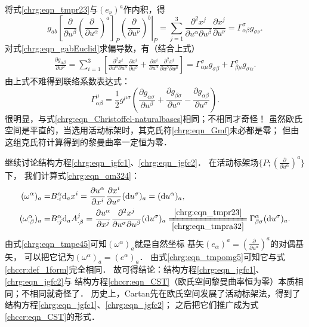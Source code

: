 将式\eqref{chrg:eqn_tmpr23}与$(e_\nu)^a$作内积，得
\begin{equation}
    g_{ab} \left[\frac{\partial }{\partial u^\beta} \left(\frac{\partial}{\partial u^\alpha}\right)^a\right]_P
    \left. \left(\frac{\partial}{\partial u^\nu}\right)^b\right|_{P}
    = \sum_{j=1}^{3}\frac{\partial^2 x^j}{\partial u^\alpha\partial u^\beta}
    \frac{\partial x^j}{\partial u^\nu}
    = \Gamma^\sigma_{\alpha\beta} g_{\sigma\nu}  .
\end{equation}
对式\eqref{chrg:eqn_gabEuclid}求偏导数，有（结合上式）
\begin{align}
    \frac{\partial g_{\alpha\beta}}{\partial u^\mu} = 
    \sum_{i=1}^{3}\left[\frac{\partial^2 x^i}{\partial u^\alpha\partial u^\mu}
    \frac{\partial x^i}{\partial u^\beta}+ \frac{\partial x^i}{\partial u^\alpha}
    \frac{\partial^2 x^i}{\partial u^\beta\partial u^\mu}   \right] 
    = \Gamma^\sigma_{\alpha\mu} g_{\sigma\beta} + \Gamma^\sigma_{\beta\mu} g_{\sigma\alpha} .
\end{align}
由上式不难得到联络系数表达式：
\begin{equation}\label{chrg:eqn_Gmf}
    \Gamma^\mu_{\alpha\beta}= \frac{1}{2} g^{\mu\sigma}\left(
    \frac{\partial g_{\alpha\sigma}}{\partial u^\beta}+
    \frac{\partial g_{\beta\sigma}}{\partial u^\alpha}-
    \frac{\partial g_{\alpha\beta}}{\partial u^\sigma}\right) .
\end{equation}
很明显，与式\eqref{chrg:eqn_Christoffel-naturalbases}相同；不相同才奇怪！
虽然欧氏空间是平直的，当选用活动标架时，其克氏符\eqref{chrg:eqn_Gmf}未必都是零；
但由这组克氏符计算得到的黎曼曲率一定恒为零．



继续讨论结构方程\eqref{chrg:eqn_jgfc1}、\eqref{chrg:eqn_jgfc2}．
在活动标架场$\{P;(\frac{\partial}{\partial u^\alpha})^a\}$下，
我们计算式\eqref{chrg:eqn_om324}：
\begin{align}
    (\omega^\alpha)_a =& B^{\alpha}_{\cdot i} {\rm d}_a x^i=\frac{\partial u^\alpha}{\partial x^i}
    \frac{\partial x^i}{\partial u^\sigma}({\rm d}u^\sigma)_a=({\rm d}u^\alpha)_a, \label{chrg:eqn_tmpe45} \\
    (\omega^{\alpha}_{\cdot \beta})_a=&B^{\alpha}_{\cdot j}{\rm d}_a A^j_{\cdot \beta}
    =\frac{\partial u^\alpha}{\partial x^j} \frac{\partial^2 x^j}
    {\partial u^\sigma\partial u^\beta}({\rm d}u^\sigma)_a
    \xlongequal[\ref{chrg:eqn_tmpra32}]{\ref{chrg:eqn_tmpr23}}
    \Gamma^\alpha_{\beta \sigma}({\rm d}u^\sigma)_a. \label{chrg:eqn_tmpomg5}
\end{align}
由式\eqref{chrg:eqn_tmpe45}可知$(\omega^\alpha)_a$就是自然坐标
基矢$(e_\alpha)^a=(\frac{\partial}{\partial u^\alpha})^a$的对偶基矢，
可以把它记为$(\omega^\alpha)_a=(e^\alpha)_a$．
由式\eqref{chrg:eqn_tmpomg5}可知它与式\eqref{chccr:def_1form}完全相同．
故可得结论：结构方程\eqref{chrg:eqn_jgfc1}、\eqref{chrg:eqn_jgfc2}与
结构方程\eqref{chccr:eqn_CST}（欧氏空间黎曼曲率恒为零）本质相同；不相同就奇怪了．
历史上，Cartan先在欧氏空间发展了活动标架法，得到了结构方程\eqref{chrg:eqn_jgfc1}、\eqref{chrg:eqn_jgfc2}；
之后把它们推广成为式\eqref{chccr:eqn_CST}的形式．


